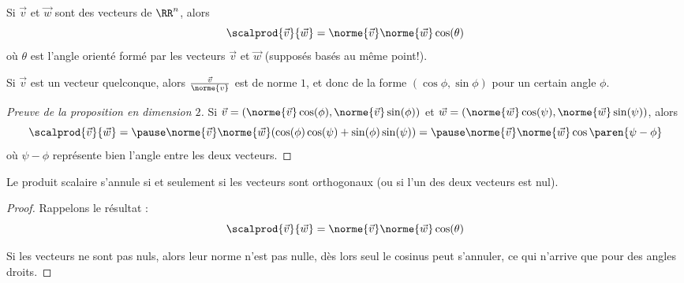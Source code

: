 \documentclass[french,xcolor=svgnames]{beamer}
\begin{document}
\begin{frame}
  \begin{proposition}
    Si \(\vec v\) et \(\vec w\) sont des vecteurs de \(\RR^{n}\), alors\pause{}
    \begin{equation*}
      \scalprod{\vec v}{\vec w} = \norme {\vec v}\norme{\vec w} \cos(\theta)
    \end{equation*}\pause{}
    où \(\theta\) est l'angle orienté formé par les vecteurs \(\vec v\) et \(\vec w\) (supposés basés au même point!).
  \end{proposition}\pause
  \begin{remark}
    Si \(\vec{v}\) est un vecteur quelconque,\pause{} alors \(\frac{\vec{v}}{\norme{v}}\) est de norme \(1\),\pause{} et donc de la forme \((\cos\phi,\sin\phi)\) pour un certain angle \(\phi\).
  \end{remark}\pause
  \begin{proof}[Preuve de la proposition en dimension \(2\)]
    Si \(\vec v = (\norme {\vec v} \cos(\phi), \norme {\vec v} \sin(\phi))\)\pause{} et  \(\vec w = (\norme {\vec w} \cos(\psi), \norme {\vec w} \sin(\psi))\),\pause{} alors 
    \begin{equation*}
      \scalprod{\vec v}{\vec w} =\pause \norme{\vec v}  \norme{\vec w} (\cos(\phi)\cos(\psi) + \sin(\phi)\sin(\psi)) =\pause \norme{\vec v}\norme{\vec w} \cos{\paren{\psi-\phi}}
    \end{equation*}
    où \(\psi-\phi\) représente bien l'angle entre les deux vecteurs.
  \end{proof}
\end{frame}

\begin{frame}
  \begin{corollary}
    Le produit scalaire s'annule si et seulement si les vecteurs sont orthogonaux (ou si l'un des deux vecteurs est nul).\pause{}
  \end{corollary}
  \begin{proof}
    Rappelons le résultat :
    \begin{equation*}
      \scalprod{\vec v}{\vec w} = \norme {\vec v}\norme{\vec w} \cos(\theta)
    \end{equation*}\pause{}

    Si les vecteurs ne sont pas nuls, alors leur norme n'est pas nulle\pause{}, dès lors seul le cosinus peut s'annuler\pause{}, ce qui n'arrive que pour des angles droits.\pause{}
  \end{proof}
\end{frame}
\end{document}
